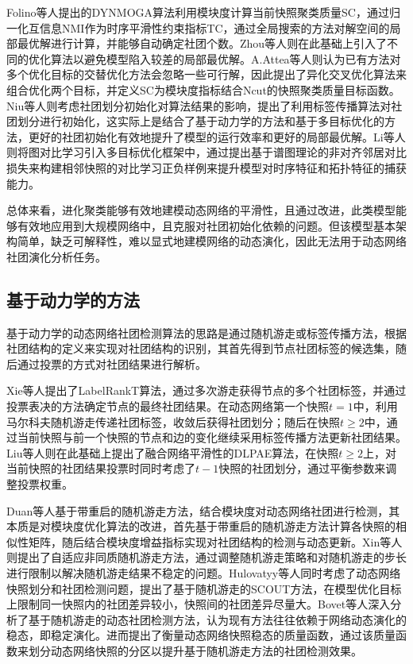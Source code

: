 Folino等人\cite{folino2013evolutionary}提出的DYNMOGA算法利用模块度计算当前快照聚类质量SC，通过归一化互信息NMI作为时序平滑性约束指标TC，通过全局搜索的方法对解空间的局部最优解进行计算，并能够自动确定社团个数。Zhou等人\cite{zhou2015multiobjective,zhou2017multiobjective}则在此基础上引入了不同的优化算法以避免模型陷入较差的局部最优解。A.Attea等人\cite{bara2016new}则认为已有方法对多个优化目标的交替优化方法会忽略一些可行解，因此提出了异化交叉优化算法来组合优化两个目标，并定义SC为模块度指标结合Ncut\cite{NEURIPS2024_a3017a8d}的快照聚类质量目标函数。Niu等人\cite{niu2017label}则考虑社团划分初始化对算法结果的影响，提出了利用标签传播算法对社团划分进行初始化，这实际上是结合了基于动力学的方法和基于多目标优化的方法，更好的社团初始化有效地提升了模型的运行效率和更好的局部最优解。Li等人\cite{LI2025129548}则将图对比学习引入多目标优化框架中，通过提出基于谱图理论的非对齐邻居对比损失来构建相邻快照的对比学习正负样例来提升模型对时序特征和拓扑特征的捕获能力。

总体来看，进化聚类能够有效地建模动态网络的平滑性，且通过改进，此类模型能够有效地应用到大规模网络中，且克服对社团初始化依赖的问题。但该模型基本架构简单，缺乏可解释性，难以显式地建模网络的动态演化，因此无法用于动态网络社团演化分析任务。

\subsection{基于动力学的方法}

基于动力学的动态网络社团检测算法的思路是通过随机游走或标签传播方法，根据社团结构的定义来实现对社团结构的识别，其首先得到节点社团标签的候选集，随后通过投票的方式对社团结果进行解析。

Xie等人\cite{xie2013labelrankt}提出了LabelRankT算法，通过多次游走获得节点的多个社团标签，并通过投票表决的方法确定节点的最终社团结果。在动态网络第一个快照$t=1$中，利用马尔科夫随机游走传递社团标签，收敛后获得社团划分；随后在快照$t \ge 2$中，通过当前快照与前一个快照的节点和边的变化继续采用标签传播方法更新社团结果。Liu等人\cite{liu2015label}则在此基础上提出了融合网络平滑性的DLPAE算法，在快照$t \ge 2$上，对当前快照的社团结果投票时同时考虑了$t-1$快照的社团划分，通过平衡参数来调整投票权重。

Duan等人\cite{duan2009community}基于带重启的随机游走方法，结合模块度对动态网络社团进行检测，其本质是对模块度优化算法的改进，首先基于带重启的随机游走方法计算各快照的相似性矩阵，随后结合模块度增益指标实现对社团结构的检测与动态更新。Xin等人\cite{xin2016adaptive}则提出了自适应非同质随机游走方法，通过调整随机游走策略和对随机游走的步长进行限制以解决随机游走结果不稳定的问题。Hulovatyy等人\cite{hulovatyy2016scout}同时考虑了动态网络快照划分和社团检测问题，提出了基于随机游走的SCOUT方法，在模型优化目标上限制同一快照内的社团差异较小，快照间的社团差异尽量大。Bovet等人\cite{doi:10.1126/sciadv.abj3063}深入分析了基于随机游走的动态社团检测方法，认为现有方法往往依赖于网络动态演化的稳态，即稳定演化。进而提出了衡量动态网络快照稳态的质量函数，通过该质量函数来划分动态网络快照的分区以提升基于随机游走方法的社团检测效果。

